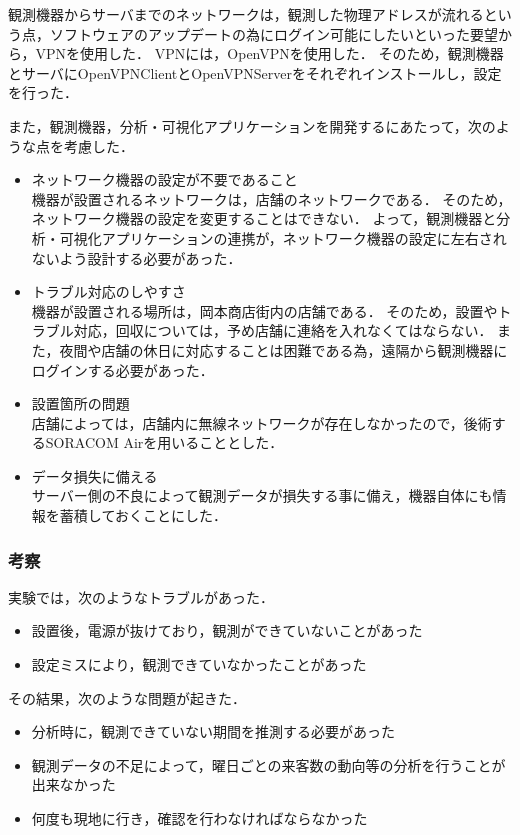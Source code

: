 観測機器からサーバまでのネットワークは，観測した物理アドレスが流れるという点，ソフトウェアのアップデートの為にログイン可能にしたいといった要望から，VPNを使用した．
VPNには，OpenVPNを使用した．
そのため，観測機器とサーバにOpenVPNClientとOpenVPNServerをそれぞれインストールし，設定を行った．

また，観測機器，分析・可視化アプリケーションを開発するにあたって，次のような点を考慮した．
\begin{itemize}
\item ネットワーク機器の設定が不要であること\\
	機器が設置されるネットワークは，店舗のネットワークである．
	そのため，ネットワーク機器の設定を変更することはできない．
	よって，観測機器と分析・可視化アプリケーションの連携が，ネットワーク機器の設定に左右されないよう設計する必要があった．
\item トラブル対応のしやすさ\\
	機器が設置される場所は，岡本商店街内の店舗である．
	そのため，設置やトラブル対応，回収については，予め店舗に連絡を入れなくてはならない．
	また，夜間や店舗の休日に対応することは困難である為，遠隔から観測機器にログインする必要があった．
\item 設置箇所の問題\\
	店舗によっては，店舗内に無線ネットワークが存在しなかったので，後術するSORACOM Airを用いることとした．
\item データ損失に備える\\
	サーバー側の不良によって観測データが損失する事に備え，機器自体にも情報を蓄積しておくことにした．
\end{itemize}

\subsubsection{考察}
実験では，次のようなトラブルがあった．
\begin{itemize}
\item 設置後，電源が抜けており，観測ができていないことがあった
\item 設定ミスにより，観測できていなかったことがあった
\end{itemize}

その結果，次のような問題が起きた．
\begin{itemize}
\item 分析時に，観測できていない期間を推測する必要があった
\item 観測データの不足によって，曜日ごとの来客数の動向等の分析を行うことが出来なかった
\item 何度も現地に行き，確認を行わなければならなかった
\end{itemize}

